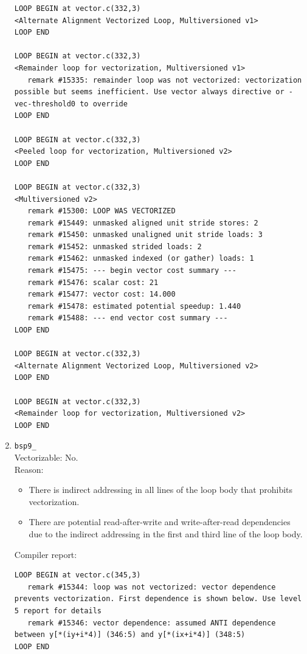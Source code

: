 \documentclass[11pt]{article}
\begin{document}
\begin{enumerate}
\begin{lstlisting}
LOOP BEGIN at vector.c(332,3)
<Alternate Alignment Vectorized Loop, Multiversioned v1>
LOOP END

LOOP BEGIN at vector.c(332,3)
<Remainder loop for vectorization, Multiversioned v1>
   remark #15335: remainder loop was not vectorized: vectorization possible but seems inefficient. Use vector always directive or -vec-threshold0 to override 
LOOP END

LOOP BEGIN at vector.c(332,3)
<Peeled loop for vectorization, Multiversioned v2>
LOOP END

LOOP BEGIN at vector.c(332,3)
<Multiversioned v2>
   remark #15300: LOOP WAS VECTORIZED
   remark #15449: unmasked aligned unit stride stores: 2 
   remark #15450: unmasked unaligned unit stride loads: 3 
   remark #15452: unmasked strided loads: 2 
   remark #15462: unmasked indexed (or gather) loads: 1 
   remark #15475: --- begin vector cost summary ---
   remark #15476: scalar cost: 21 
   remark #15477: vector cost: 14.000 
   remark #15478: estimated potential speedup: 1.440 
   remark #15488: --- end vector cost summary ---
LOOP END

LOOP BEGIN at vector.c(332,3)
<Alternate Alignment Vectorized Loop, Multiversioned v2>
LOOP END

LOOP BEGIN at vector.c(332,3)
<Remainder loop for vectorization, Multiversioned v2>
LOOP END
\end{lstlisting}

\item \texttt{bsp9\_}\\
Vectorizable: No.\\
Reason:
\begin{itemize}
\item There is indirect addressing in all lines of the loop body that prohibits vectorization.
\item There are potential read-after-write and write-after-read dependencies due to the indirect addressing in the first and third line of the loop body.
\end{itemize}
Compiler report:
\begin{lstlisting}
LOOP BEGIN at vector.c(345,3)
   remark #15344: loop was not vectorized: vector dependence prevents vectorization. First dependence is shown below. Use level 5 report for details
   remark #15346: vector dependence: assumed ANTI dependence between y[*(iy+i*4)] (346:5) and y[*(ix+i*4)] (348:5)
LOOP END
\end{lstlisting}


\end{enumerate}
\end{document}
